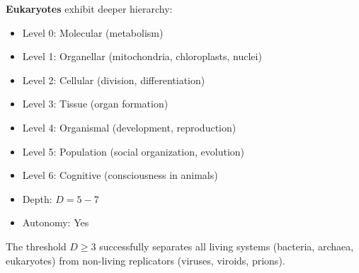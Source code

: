 \documentclass[11pt]{article}
\begin{document}
\textbf{Eukaryotes} exhibit deeper hierarchy:
\begin{itemize}
\item Level 0: Molecular (metabolism)
\item Level 1: Organellar (mitochondria, chloroplasts, nuclei)
\item Level 2: Cellular (division, differentiation)
\item Level 3: Tissue (organ formation)
\item Level 4: Organismal (development, reproduction)
\item Level 5: Population (social organization, evolution)
\item Level 6: Cognitive (consciousness in animals)
\item Depth: $D = 5-7$
\item Autonomy: Yes
\end{itemize}

The threshold $D \geq 3$ successfully separates all living systems (bacteria, archaea, eukaryotes) from non-living replicators (viruses, viroids, prions).
\end{document}
